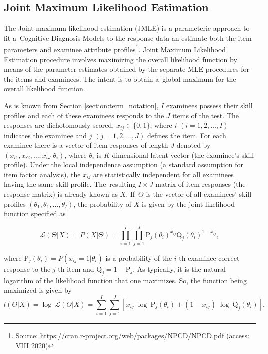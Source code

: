 \documentclass[english]{pwr_wmat_praca_dyplomowa}
\theoremstyle{plain}
\numberwithin{theorem}{chapter}
\theoremstyle{definition}
\numberwithin{theorem}{chapter}
\begin{document}
	\subsection{Joint Maximum Likelihood Estimation}
	
	The Joint maximum likelihood estimation (JMLE) is a parameteric approach to fit a~Cognitive Diagnosis Models to the response ﻿data an estimate both the item parameters and examinee attribute profiles\footnote{Source: https://cran.r-project.org/web/packages/NPCD/NPCD.pdf (access: VIII 2020)}. Joint Maximum Likelihood Estimation procedure involves maximizing the overall likelihood function by means of the parameter estimates obtained by the separate MLE procedures for the items and examinees. The intent is to obtain a~global maximum for the overall likelihood function. 
	
	As is known from Section \ref{section:term_notation}, $I$ examinees possess their skill profiles and each of these examinees responds to the $J$ items of the test. The responses are dichotomously scored, $x_{ij} \in \{0,1\}$, where $i$ $(i = 1, 2, \ldots, I)$ indicates the examinee and $j$ $( j = 1, 2, \ldots, J)$ defines the item. 
	For each examinee there is a vector of item responses of length $J$ denoted by $(x_{i1}, x_{i2}, \ldots, x_{iJ} | \theta_i)$, where $\theta_i$ is $K$-dimensional latent vector (the examinee's skill profile). Under the local independence assumption (a standard assumption for item factor analysis), the $x_{ij}$ are statistically independent for all examinees having the same skill profile. The~resulting $I \times J$ matrix of item responses (the response matrix) is already known as $X$. If~$\Theta$ is the vector of all examinees' skill profiles $(\theta_1, \theta_1, \ldots, \theta_I)$, the probability of $X$ is given by the joint likelihood function specified \cite{jmle} as
	
	\begin{equation}
	\mathcal{L}(\Theta|X) = P(X|\Theta) = \prod_{i=1}^{I} \prod_{j=1}^{J} \text{P}_j (\theta_i)^{x_{ij}} \text{Q}_j(\theta_i)^{1-x_{ij}},
	\end{equation}
	
	\noindent where $\text{P}_j (\theta_i) = P(x_{ij}=1|\theta_i) $ is a probability of the $i$-th examinee correct response to the $j$-th item and $\text{Q}_j = 1 - \text{P}_j$. As typically, it is the natural logarithm of the likelihood function that one maximizes. So, the function being maximized is given by
	\begin{equation}
	l(\Theta|X) = \log\: \mathcal{L}(\Theta|X) = \sum_{i=1}^{I} \sum_{j=1}^{J} \left[ x_{ij}\; \log\: \text{P}_j(\theta_i) + (1-x_{ij})\; \log\:  \text{Q}_j(\theta_i) \right].
	\end{equation}
	
\end{document}
